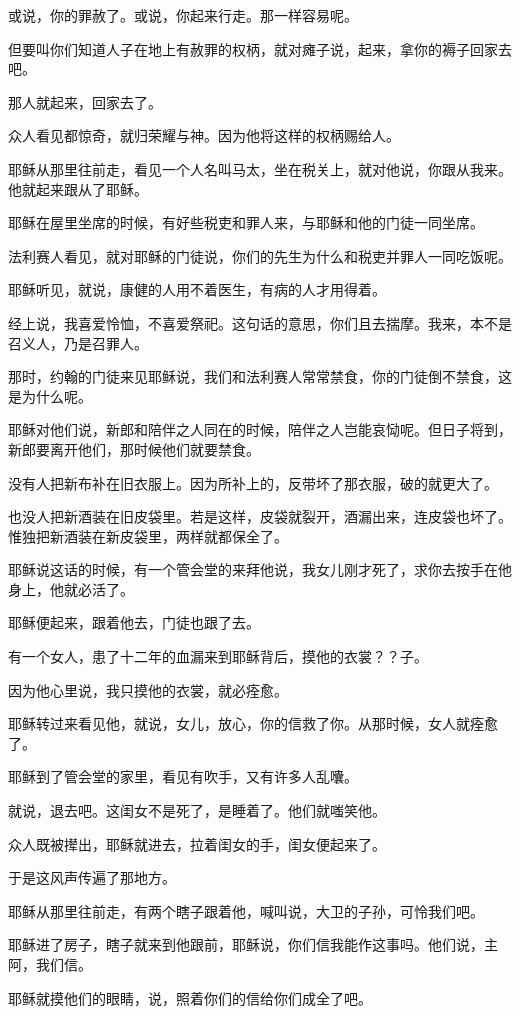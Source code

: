\documentclass[12pt,oneside]{book}
\begin{document}
或说，你的罪赦了。或说，你起来行走。那一样容易呢。

但要叫你们知道人子在地上有赦罪的权柄，就对瘫子说，起来，拿你的褥子回家去吧。

那人就起来，回家去了。

众人看见都惊奇，就归荣耀与神。因为他将这样的权柄赐给人。

耶稣从那里往前走，看见一个人名叫马太，坐在税关上，就对他说，你跟从我来。他就起来跟从了耶稣。

耶稣在屋里坐席的时候，有好些税吏和罪人来，与耶稣和他的门徒一同坐席。

法利赛人看见，就对耶稣的门徒说，你们的先生为什么和税吏并罪人一同吃饭呢。

耶稣听见，就说，康健的人用不着医生，有病的人才用得着。

经上说，我喜爱怜恤，不喜爱祭祀。这句话的意思，你们且去揣摩。我来，本不是召义人，乃是召罪人。

那时，约翰的门徒来见耶稣说，我们和法利赛人常常禁食，你的门徒倒不禁食，这是为什么呢。

耶稣对他们说，新郎和陪伴之人同在的时候，陪伴之人岂能哀恸呢。但日子将到，新郎要离开他们，那时候他们就要禁食。

没有人把新布补在旧衣服上。因为所补上的，反带坏了那衣服，破的就更大了。

也没人把新酒装在旧皮袋里。若是这样，皮袋就裂开，酒漏出来，连皮袋也坏了。惟独把新酒装在新皮袋里，两样就都保全了。

耶稣说这话的时候，有一个管会堂的来拜他说，我女儿刚才死了，求你去按手在他身上，他就必活了。

耶稣便起来，跟着他去，门徒也跟了去。

有一个女人，患了十二年的血漏来到耶稣背后，摸他的衣裳？？子。

因为他心里说，我只摸他的衣裳，就必痊愈。

耶稣转过来看见他，就说，女儿，放心，你的信救了你。从那时候，女人就痊愈了。

耶稣到了管会堂的家里，看见有吹手，又有许多人乱囔。

就说，退去吧。这闺女不是死了，是睡着了。他们就嗤笑他。

众人既被撵出，耶稣就进去，拉着闺女的手，闺女便起来了。

于是这风声传遍了那地方。

耶稣从那里往前走，有两个瞎子跟着他，喊叫说，大卫的子孙，可怜我们吧。

耶稣进了房子，瞎子就来到他跟前，耶稣说，你们信我能作这事吗。他们说，主阿，我们信。

耶稣就摸他们的眼睛，说，照着你们的信给你们成全了吧。
\end{document}
